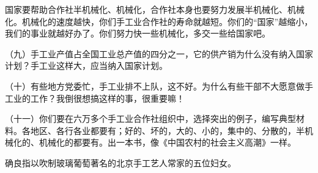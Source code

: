 国家要帮助合作社半机械化、机械化，合作社本身也要努力发展半机械化、机械化。机械化的速度越快，你们手工业合作社的寿命就越短。你们的“国家”越缩小，我们的事业就越好办了。你们努力快一些机械化，多交一些给国家吧。

（九）手工业产值占全国工业总产值的四分之一，它的供产销为什么没有纳入国家计划？手工业这样大，应当纳入国家计划。

（十）有些地方党委忙，手工业排不上队，这不好。为什么有些干部不大愿意做手工业的工作？我倒很想搞这样的事，很重要嘛！

（十一）你们要在六万多个手工业合作社组织中，选择突出的例子，编写典型材料。各地区、各行各业都要有；好的、坏的，大的、小的，集中的、分散的，半机械化的、机械化的都要有。出一本书，像《中国农村的社会主义高潮》一样。


\begin{maonote}
确良指以吹制玻璃葡萄著名的北京手工艺人常家的五位妇女。
\end{maonote}
